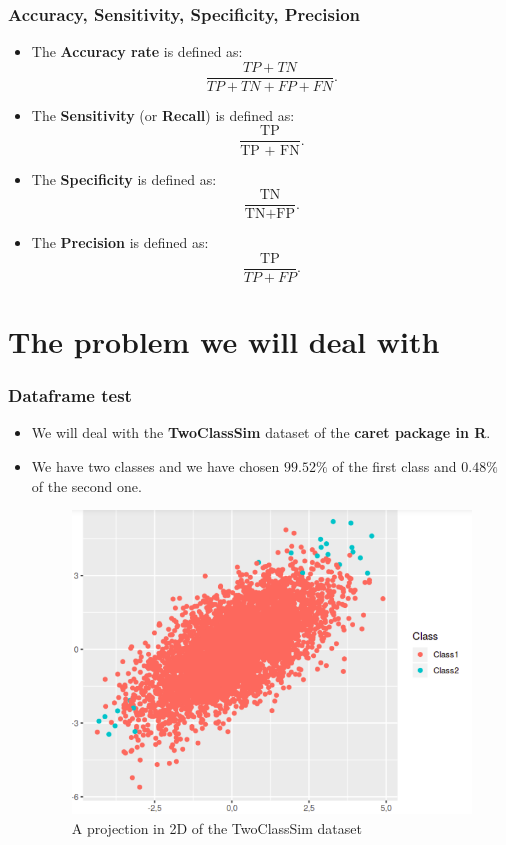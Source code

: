\documentclass[9pt]{beamer}
\begin{document}
\begin{frame}
\frametitle{Accuracy, Sensitivity, Specificity, Precision}
\begin{itemize}
\item<1 -> The \textbf{Accuracy rate} is defined as:
$$\dfrac{TP + TN}{TP + TN + FP + FN}.$$
\item<2 -> The \textbf{Sensitivity} (or \textbf{Recall}) is defined as: $$\dfrac{\mbox{TP}}{\mbox{TP + FN}}.$$
\item<3 -> The \textbf{Specificity} is defined as: $$\dfrac{\mbox{TN}}{\mbox{TN+FP}}.$$
\item<4 -> The \textbf{Precision} is defined as: $$\dfrac{\mbox{TP}}{TP + FP}.$$
\end{itemize}
\end{frame}
\section{The problem we will deal with}
\begin{frame}
\frametitle{Dataframe test}
\begin{itemize}
\item We will deal with the \textbf{TwoClassSim} dataset of the \textbf{caret package in R}.
\item We have two classes and we have chosen $99.52\%$ of the first class and $0.48\%$ of the second one.
\vspace{3mm}
\begin{figure}[ht]
\includegraphics[scale=0.40]{images/twoclasssim.png}
\caption{A projection in 2D of the TwoClassSim dataset}
\end{figure}
\end{itemize}
\end{frame}
\end{document}
